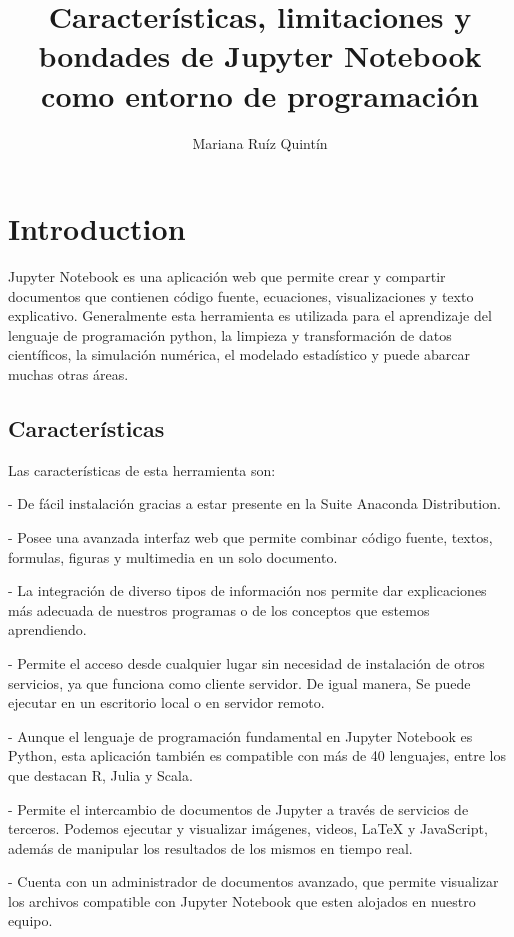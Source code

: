 \documentclass{article}
\title{Características, limitaciones y bondades de Jupyter Notebook como entorno de programación}
\author{Mariana Ruíz Quintín}
\begin{document}
\maketitle

\section{Introduction}

Jupyter Notebook es una aplicación web que permite crear y compartir documentos que contienen código fuente, ecuaciones, visualizaciones y texto explicativo.  Generalmente esta herramienta es utilizada para el aprendizaje del lenguaje de programación python, la limpieza y transformación de datos científicos, la simulación numérica, el modelado estadístico y puede abarcar muchas otras áreas.

\subsection{Características}

Las características de esta herramienta son:

 - De fácil instalación gracias a estar presente en la Suite Anaconda Distribution.

- Posee una avanzada interfaz web que permite combinar código fuente, textos, formulas, figuras y multimedia en un solo documento.

- La integración de diverso tipos de información nos permite dar explicaciones más adecuada de nuestros programas o de los conceptos que estemos aprendiendo.

- Permite el acceso desde cualquier lugar sin necesidad de instalación de otros servicios, ya que funciona como cliente servidor. De igual manera, Se puede ejecutar en un escritorio local o en servidor remoto.

- Aunque el lenguaje de programación fundamental en Jupyter Notebook es Python, esta aplicación también es compatible con más de 40 lenguajes, entre los que destacan R, Julia y Scala.

- Permite el intercambio de documentos de Jupyter a través de servicios de terceros.
Podemos ejecutar y visualizar imágenes, videos, LaTeX y JavaScript, además de manipular los resultados de los mismos en tiempo real.

- Cuenta con un administrador de documentos avanzado, que permite visualizar los archivos compatible con Jupyter Notebook que esten alojados en nuestro equipo.
\end{document}

